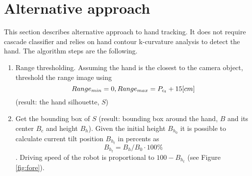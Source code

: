 \documentclass[a4paper, 12pt]{article}
\begin{document}
\section{Alternative approach}
This section describes alternative approach to hand tracking. It does not require cascade classifier and relies on hand contour k-curvature \cite{Segen} analysis to detect the hand. The algorithm steps are the following.
\begin{enumerate}
\item Range thresholding. Assuming the hand is the closest to the camera object, threshold the range image using
    \[
        Range_{min} = 0,  \\
        Range_{max} = {P_{c_t}}+15[cm]
    \] (result: the hand silhouette, $S$)
\item Get the bounding box of $S$ (result: bounding box around the hand, $B$ and its center $B_c$ and height $B_h$). Given the initial height $B_{h_0}$ it is possible to calculate current tilt position $B_{h_t}$ in percents as 
\[
B_{h_t} = B_h / B_0 \cdot 100\%
\]. Driving speed of the robot is proportional to $100-B_{h_t}$ (see Figure \ref{fig:fore}).


\end{enumerate}
\end{document}
